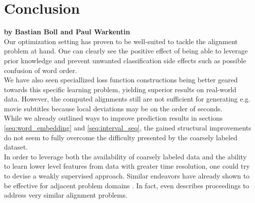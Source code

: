 \section{Conclusion}

\textbf{by Bastian Boll and Paul Warkentin} \\

Our optimization setting has proven to be well-suited to tackle the alignment problem at hand. One can clearly see the positive effect of being able to leverage prior knowledge and prevent unwanted classification side effects such as possible confusion of word order.\\
We have also seen speciallized loss function constructions being better geared towards this specific learning problem, yielding superior results on real-world data. However, the computed alignments still are not sufficient for generating e.g. movie subtitles because local deviations may be on the order of seconds.\\

While we already outlined ways to improve prediction results in sections \ref{seq:word_embedding} and \ref{seq:interval_seq}, the gained structural improvements do not seem to fully overcome the difficulty presented by the coarsely labeled dataset.\\
In order to leverage both the availability of coarsely labeled data and the ability to learn lower level features from data with greater time resolution, one could try to devise a weakly supervised approach. Similar endeavors have already shown to be effective for adjacent problem domains \cite{wei2017personalized, synnaeve2014weakly}. In fact, \cite{serriere2016weakly} even describes proceedings to address very similar alignment problems.



